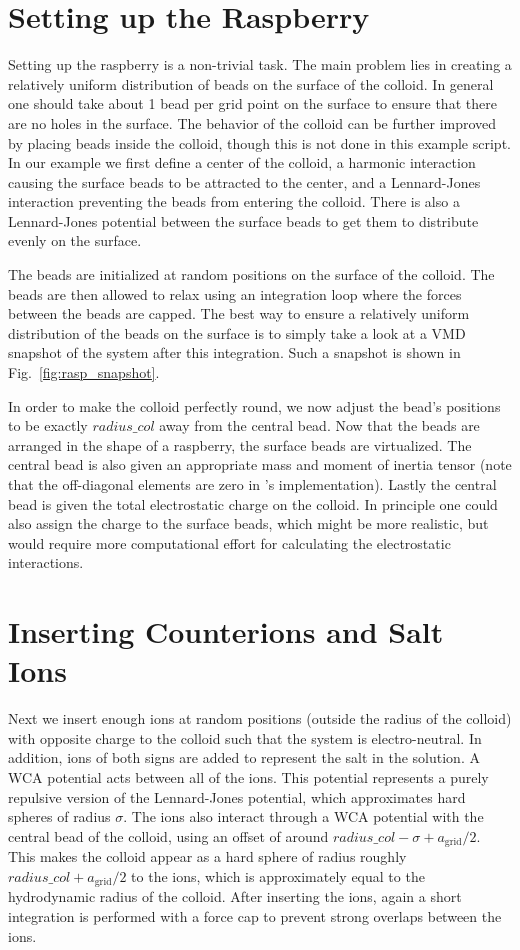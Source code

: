 \documentclass[
paper=a4,                       %
fontsize=11pt,                  %
twoside,                        %
footsepline,                    %
headsepline,                    %
headinclude=false,              %
footinclude=false,              %
pagesize,                       %
]{scrartcl}
\begin{document}
\section{Setting up the Raspberry}

Setting up the raspberry is a non-trivial task. The main problem lies in creating a relatively
uniform distribution of beads on the surface of the colloid. In general one should take about 1 bead per grid
point on the surface to ensure that there are no holes in the surface. The behavior of the colloid can be further improved by placing
beads inside the colloid, though this is not done in this example script. In our example
we first define a center of the colloid, a harmonic interaction causing the surface beads to be attracted
to the center, and a Lennard-Jones interaction preventing the beads from entering the colloid. There is also a Lennard-Jones
potential between the surface beads to get them to distribute evenly on the surface. 

The beads are initialized at random positions on the surface of the colloid. The beads are then allowed to relax using
an integration loop where the forces between the beads are capped. The best way to ensure a relatively uniform distribution
of the beads on the surface is to simply take a look at a VMD snapshot of the system after this integration. Such a snapshot is shown in Fig.~\ref{fig:rasp_snapshot}.

In order to make the colloid perfectly round, we now adjust the bead's positions to be exactly $radius\_col$ away
from the central bead.
Now that the beads are arranged in the shape of a raspberry, the surface beads are virtualized. The central
bead is also given an appropriate mass and moment of inertia tensor (note that the off-diagonal elements
are zero in \es{}'s implementation). Lastly the central bead is given the total electrostatic charge on the colloid. In principle
one could also assign the charge to the surface beads, which might be more realistic, but would require more computational
effort for calculating the electrostatic interactions.

\section{Inserting Counterions and Salt Ions}

Next we insert enough ions at random positions (outside the radius of the colloid) with opposite charge to the colloid such that the system is electro-neutral. In addition, ions
of both signs are added to represent the salt in the solution. A WCA potential acts between all of the ions. This potential represents a purely repulsive
version of the Lennard-Jones potential, which approximates hard spheres of radius $\sigma$. The ions also interact through a WCA potential
with the central bead of the colloid, using an offset of around $radius\_col-\sigma +a_\mathrm{grid}/2$. This makes
the colloid appear as a hard sphere of radius roughly $radius\_col+a_\mathrm{grid}/2$ to the ions, which is approximately equal to the
hydrodynamic radius of the colloid. After inserting the ions, again a short integration is performed with a force cap to
prevent strong overlaps between the ions.
\end{document}
